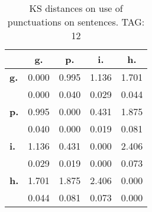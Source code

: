 \begin{table}[h!]
\begin{center}
\begin{tabular}{| l || c | c | c | c |}\hline
 & {\bf g.} & {\bf p.} & {\bf i.} & {\bf h.} \\\hline\hline
{\bf g.} & 0.000 & 0.995 & 1.136 & 1.701 \\
{\bf } & 0.000 & 0.040 & 0.029 & 0.044 \\\hline
{\bf p.} & 0.995 & 0.000 & 0.431 & 1.875 \\
{\bf } & 0.040 & 0.000 & 0.019 & 0.081 \\\hline
{\bf i.} & 1.136 & 0.431 & 0.000 & 2.406 \\
{\bf } & 0.029 & 0.019 & 0.000 & 0.073 \\\hline
{\bf h.} & 1.701 & 1.875 & 2.406 & 0.000 \\
{\bf } & 0.044 & 0.081 & 0.073 & 0.000 \\\hline
\end{tabular}
\caption{KS distances on use of punctuations on sentences. TAG: 12}
\end{center}
\end{table}